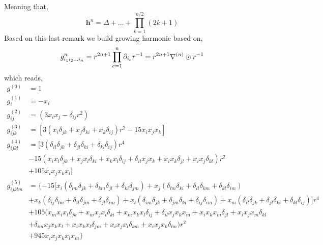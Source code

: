 \documentclass[12pt]{My_preprint}
\newcommand{\ii}{\delta}
\begin{document}
Meaning that, 
\begin{equation}
    \textbf{h}^n = \Delta
    + \ldots + \prod_{k=1}^{n/2} (2k+1)
\end{equation}
Based on this last remark we build growing harmonic based on, 
\begin{equation}
    g^{n}_{i_1i_2\ldots i_n}
    =
    r^{2n+1}
    \prod_{e=1}^{n}
    \partial_{i_e}
    r^{-1}
    =r^{2n+1} \mathbf{\nabla}^{(n)}
    \odot 
    r^{-1}
\end{equation}
which reads,
\begin{align*}
    g^{(0)} &= 1\\
    g^{(1)}_i &= - x_i \\
    g^{(2)}_{ij} &= (3 x_i x_j - \ii_{ij} r^{2})\\
    g^{(3)}_{ijk} &= [3 (x_i \ii_{jk} + x_j \ii_{ki} + x_k \ii_{ij})r^2 - 15 x_ix_jx_k ]\\
    g^{(4)}_{ijkl} &= [
    3 (\ii_{il} \ii_{jk} + \ii_{jl} \ii_{ki} + \ii_{kl} \ii_{ij})r^4 \\
    &- 15 (x_ix_l  \ii_{jk} + x_jx_l  \ii_{ki} + x_k x_l \ii_{ij} + \ii_{il}x_jx_k+ x_i x_k\ii_{jl}+x_ix_j\ii_{kl}) r^2\\
    &+ 105  x_ix_jx_kx_l 
    ]\\
    g^{(5)}_{ijklm} &= \{
    - 15 [
        x_i ( \ii_{lm} \ii_{jk}+\ii_{km}\ii_{jl}+\ii_{kl}\ii_{jm}) 
        + x_j ( \ii_{lm}\ii_{ki}+\ii_{il}\ii_{km}+\ii_{kl}\ii_{im})\\
        &+ x_k (\ii_{ij}\ii_{lm}+\ii_{il}\ii_{jm} +\ii_{jl}\ii_{im})
        + x_l (\ii_{im} \ii_{jk}+ \ii_{jm}\ii_{ki}+\ii_{ij}\ii_{im})
        + x_m (\ii_{il} \ii_{jk} + \ii_{jl} \ii_{ki} + \ii_{kl} \ii_{ij})
     ] r^4 \\
    &+ 105  (x_mx_ix_l  \ii_{jk} + x_m x_jx_l  \ii_{ki} + x_m x_k x_l\ii_{ij} + \ii_{il}x_jx_kx_m + x_i x_kx_m\ii_{jl}+x_ix_jx_m \ii_{kl}\\
    &+ \ii_{im}x_jx_kx_l+x_ix_kx_l\ii_{jm}+x_ix_jx_l\ii_{km}+x_ix_jx_k\ii_{lm}) r^2\\
    &+ 945  x_ix_jx_kx_lx_m 
    \} \\
\end{align*}
\end{document}
